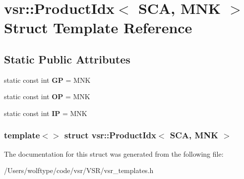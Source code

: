 \hypertarget{structvsr_1_1_product_idx_3_01_s_c_a_00_01_m_n_k_01_4}{\section{vsr\-:\-:Product\-Idx$<$ S\-C\-A, M\-N\-K $>$ Struct Template Reference}
\label{structvsr_1_1_product_idx_3_01_s_c_a_00_01_m_n_k_01_4}
}
\subsection*{Static Public Attributes}
\begin{DoxyCompactItemize}
\item 
\hypertarget{structvsr_1_1_product_idx_3_01_s_c_a_00_01_m_n_k_01_4_a2d13059365b53306e3ff672f1d7a9e7d}{static const int {\bfseries G\-P} = M\-N\-K}\label{structvsr_1_1_product_idx_3_01_s_c_a_00_01_m_n_k_01_4_a2d13059365b53306e3ff672f1d7a9e7d}

\item 
\hypertarget{structvsr_1_1_product_idx_3_01_s_c_a_00_01_m_n_k_01_4_afbb7984b2330fa2c0237a967eec9c681}{static const int {\bfseries O\-P} = M\-N\-K}\label{structvsr_1_1_product_idx_3_01_s_c_a_00_01_m_n_k_01_4_afbb7984b2330fa2c0237a967eec9c681}

\item 
\hypertarget{structvsr_1_1_product_idx_3_01_s_c_a_00_01_m_n_k_01_4_a9babbfa4f5a117d61b3448cfa583ffa3}{static const int {\bfseries I\-P} = M\-N\-K}\label{structvsr_1_1_product_idx_3_01_s_c_a_00_01_m_n_k_01_4_a9babbfa4f5a117d61b3448cfa583ffa3}

\end{DoxyCompactItemize}
\subsubsection*{template$<$$>$ struct vsr\-::\-Product\-Idx$<$ S\-C\-A, M\-N\-K $>$}



The documentation for this struct was generated from the following file\-:\begin{DoxyCompactItemize}
\item 
/\-Users/wolftype/code/vsr/\-V\-S\-R/vsr\-\_\-templates.\-h\end{DoxyCompactItemize}
